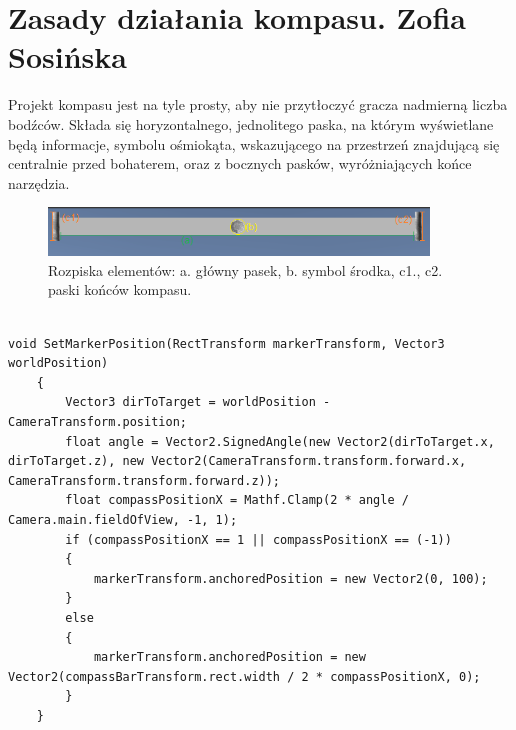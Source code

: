 \section{Zasady działania kompasu. Zofia Sosińska}\label{chap:naw}

Projekt kompasu jest na tyle prosty, aby nie przytłoczyć gracza nadmierną liczba bodźców. Składa się horyzontalnego, jednolitego paska, na którym wyświetlane będą informacje, symbolu ośmiokąta, wskazującego na przestrzeń znajdującą się centralnie przed bohaterem, oraz z bocznych pasków, wyróżniających końce narzędzia.

\begin{figure}[htbp]
    \centering
    \includegraphics[width=0.9\textwidth]{images/ui/opis_ekementow_kompasu.png}
    \caption{Rozpiska elementów: a. główny pasek, b. symbol środka, c1., c2. paski końców kompasu.}\label{fig:compass_design}
\end{figure}

\begin{lstlisting}[caption=Fragment kodu odpowiedzialny za ustawienie symbolu na pasku kompasu]

void SetMarkerPosition(RectTransform markerTransform, Vector3 worldPosition)
    {
        Vector3 dirToTarget = worldPosition - CameraTransform.position;
        float angle = Vector2.SignedAngle(new Vector2(dirToTarget.x, dirToTarget.z), new Vector2(CameraTransform.transform.forward.x, CameraTransform.transform.forward.z));
        float compassPositionX = Mathf.Clamp(2 * angle / Camera.main.fieldOfView, -1, 1);
        if (compassPositionX == 1 || compassPositionX == (-1))
        {
            markerTransform.anchoredPosition = new Vector2(0, 100);
        }
        else
        {
            markerTransform.anchoredPosition = new Vector2(compassBarTransform.rect.width / 2 * compassPositionX, 0);
        }
    }
\end{lstlisting}